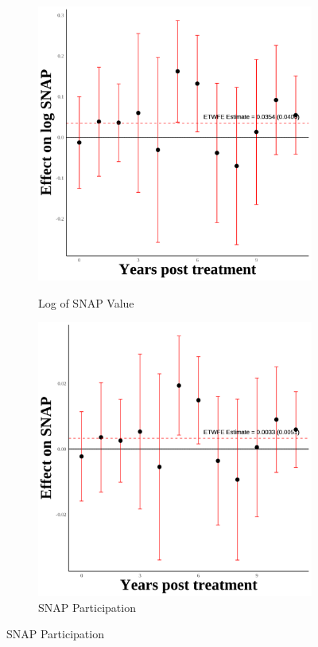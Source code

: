 \documentclass[12pt,english]{article}
\begin{document}
\begin{figure}[H]
  \vspace{0.3cm} %

  \begin{subfigure}[b]{0.3\textwidth}
    \centering
    \caption{Log of SNAP Value}
    \includegraphics[width=\linewidth]{figures/plot84-ln_snap_event_study-third-four.png}
    \label{fig:ln-snap-third-four}
  \end{subfigure}
  \hfill
  \begin{subfigure}[b]{0.3\textwidth}
    \centering
    \caption{SNAP Participation}
    \includegraphics[width=\linewidth]{figures/plot85-snap_event_study-third-four.png}

\end{subfigure}
\end{figure}
\end{document}
